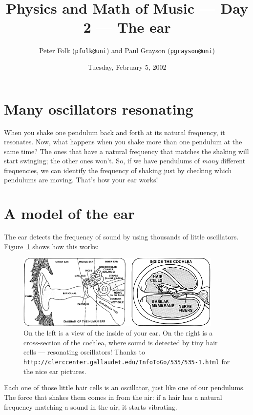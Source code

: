 \documentclass{article}
\begin{document}
\title{Physics and Math of Music --- Day 2 --- The ear}
\date{Tuesday, February 5, 2002}
\author{Peter Folk ({\tt pfolk@uni}) and Paul Grayson ({\tt pgrayson@uni})}
\maketitle

\section*{Many oscillators resonating}
When you shake one pendulum back and forth at its natural frequency,
it resonates.  Now, what happens when you shake more than one pendulum
at the same time?  The ones that have a natural frequency that matches
the shaking will start swinging; the other ones won't.  So, if we have
pendulums of {\sl many\/} different frequencies, we can identify the
frequency of shaking just by checking which pendulums are moving.
That's how your ear works!

\section*{A model of the ear}
The ear detects the frequency of sound by using thousands of
little oscillators.  Figure~\ref{ear} shows how this works:

\begin{figure}[h]
\begin{center}
	\includegraphics[width=4in]{figures/ear2.png}
	\caption{On the left is a view of the inside of your ear.  On the right is a
	cross-section of the cochlea, where sound is detected by tiny hair
	cells --- resonating oscillators! Thanks to
	{\tt http://clerccenter.gallaudet.edu/InfoToGo/535/535-1.html} for
	the nice ear pictures.}\label{ear}
\end{center}
\end{figure}

Each one of those little hair cells is an oscillator, just like one of
our pendulums.  The force that shakes them comes in from the air: if a
hair has a natural frequency matching a sound in the air, it starts
vibrating.
\end{document}
